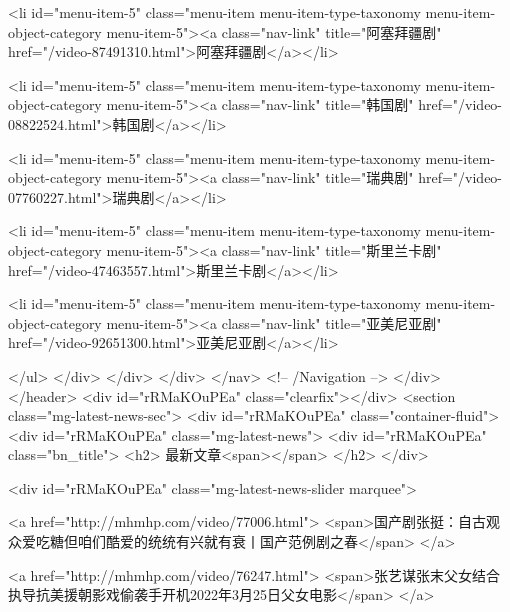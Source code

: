                             <li id="menu-item-5" class="menu-item menu-item-type-taxonomy menu-item-object-category menu-item-5"><a class="nav-link" title="阿塞拜疆剧" href="/video-87491310.html">阿塞拜疆剧</a></li>
                            
                            <li id="menu-item-5" class="menu-item menu-item-type-taxonomy menu-item-object-category menu-item-5"><a class="nav-link" title="韩国剧" href="/video-08822524.html">韩国剧</a></li>
                            
                            <li id="menu-item-5" class="menu-item menu-item-type-taxonomy menu-item-object-category menu-item-5"><a class="nav-link" title="瑞典剧" href="/video-07760227.html">瑞典剧</a></li>
                            
                            <li id="menu-item-5" class="menu-item menu-item-type-taxonomy menu-item-object-category menu-item-5"><a class="nav-link" title="斯里兰卡剧" href="/video-47463557.html">斯里兰卡剧</a></li>
                            
                            <li id="menu-item-5" class="menu-item menu-item-type-taxonomy menu-item-object-category menu-item-5"><a class="nav-link" title="亚美尼亚剧" href="/video-92651300.html">亚美尼亚剧</a></li>
                            
                        </ul>
                    </div>
                </div>
            </div>
        </nav> <!-- /Navigation -->
    </div>
</header>
            <div id="rRMaKOuPEa"  class="clearfix"></div>
            <section class="mg-latest-news-sec">
                <div id="rRMaKOuPEa"  class="container-fluid">
                    <div id="rRMaKOuPEa"  class="mg-latest-news">
                        <div id="rRMaKOuPEa"  class="bn_title">
                            <h2>
                                最新文章<span></span>
                            </h2>
                        </div>

                        <div id="rRMaKOuPEa"  class="mg-latest-news-slider marquee">
                            
                            <a href="http://mhmhp.com/video/77006.html">
                                <span>国产剧张挺：自古观众爱吃糖但咱们酷爱的统统有兴就有衰丨国产范例剧之春</span>
                            </a>
                          
                            <a href="http://mhmhp.com/video/76247.html">
                                <span>张艺谋张末父女结合执导抗美援朝影戏偷袭手开机2022年3月25日父女电影</span>
                            </a>
                          
